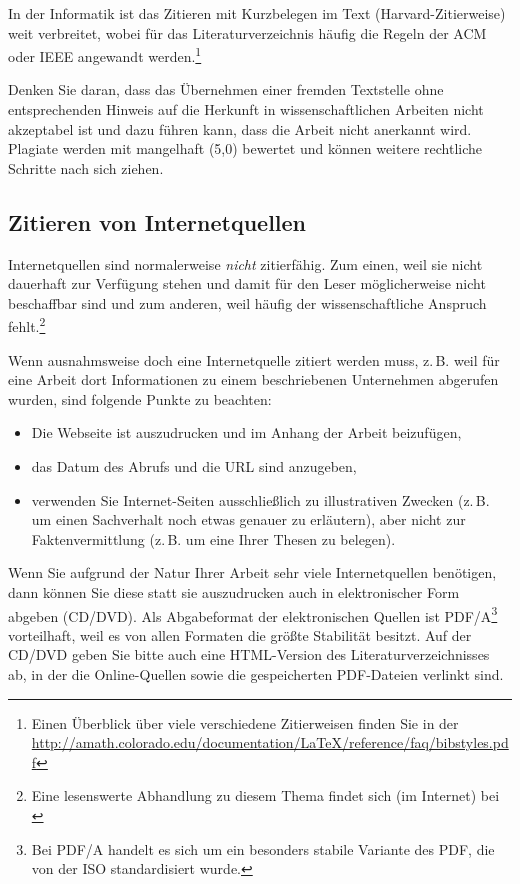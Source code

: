 \documentclass[a4paper,11pt,headings=normal]{scrartcl}
\begin{document}
In der Informatik ist das Zitieren mit Kurzbelegen im Text (Harvard-Zitierweise) weit verbreitet, wobei für das Literaturverzeichnis häufig die Regeln der \acs{ACM} oder \acs{IEEE} angewandt werden.\footnote{Einen Überblick über viele verschiedene Zitierweisen finden Sie in der \url{http://amath.colorado.edu/documentation/LaTeX/reference/faq/bibstyles.pdf}}

Denken Sie daran, dass das Übernehmen einer fremden Textstelle ohne entsprechenden Hinweis auf die Herkunft in wissenschaftlichen Arbeiten nicht akzeptabel ist und dazu führen kann, dass die Arbeit nicht anerkannt wird. Plagiate werden mit mangelhaft (5,0) bewertet und können weitere rechtliche Schritte nach sich ziehen.

\subsection{Zitieren von Internetquellen}
Internetquellen sind normalerweise \textit{nicht} zitierfähig. Zum einen, weil sie nicht dauerhaft zur Verfügung stehen und damit für den Leser möglicherweise nicht beschaffbar sind und zum anderen, weil häufig der wissenschaftliche Anspruch fehlt.\footnote{Eine lesenswerte Abhandlung zu diesem Thema findet sich (im Internet) bei \cite{Weber2006}}

Wenn ausnahmsweise doch eine Internetquelle zitiert werden muss, z.\,B. weil für eine Arbeit dort Informationen zu einem beschriebenen Unternehmen abgerufen wurden, sind folgende Punkte zu beachten:

\begin{itemize}
\item Die Webseite ist auszudrucken und im Anhang der Arbeit beizufügen,
\item das Datum des Abrufs und die URL sind anzugeben,
\item verwenden Sie Internet-Seiten ausschließlich zu illustrativen Zwecken (z.\,B. um einen Sachverhalt noch etwas genauer zu erläutern), aber nicht zur Faktenvermittlung (z.\,B. um eine Ihrer Thesen zu belegen).
\end{itemize}

Wenn Sie aufgrund der Natur Ihrer Arbeit sehr viele Internetquellen benötigen, dann können Sie diese statt sie auszudrucken auch in elektronischer Form abgeben (CD/DVD). Als Abgabeformat der elektronischen Quellen ist PDF/A\footnote{Bei PDF/A handelt es sich um ein besonders stabile Variante des \ac{PDF}, die von der  \ac{ISO} standardisiert wurde.} vorteilhaft, weil es von allen Formaten die größte Stabilität besitzt.
Auf der CD/DVD geben Sie bitte auch eine HTML-Version des Literaturverzeichnisses ab, in der die Online-Quellen sowie die gespeicherten PDF-Dateien verlinkt sind.
\end{document}
